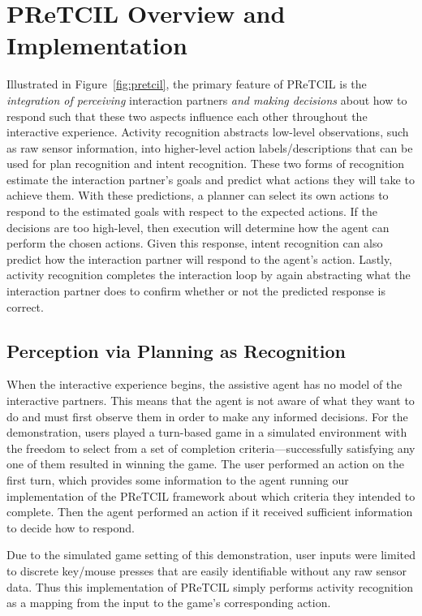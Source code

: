\documentclass[letterpaper]{article} %
\begin{document}
\section{{\sc PReTCIL} Overview and Implementation\label{sec:pretcil}}
Illustrated in Figure~\ref{fig:pretcil}, the primary feature of {\sc PReTCIL} is the \textit{integration of perceiving} interaction partners \textit{and making decisions} about how to respond such that these two aspects influence each other throughout the interactive experience.  Activity recognition abstracts low-level observations, such as raw sensor information, into higher-level action labels/descriptions that can be used for plan recognition and intent recognition.  These two forms of recognition estimate the interaction partner's goals and predict what actions they will take to achieve them.  With these predictions, a planner can select its own actions to respond to the estimated goals with respect to the expected actions.  If the decisions are too high-level, then execution will determine how the agent can perform the chosen actions.  Given this response, intent recognition can also predict how the interaction partner will respond to the agent's action.  Lastly, activity recognition completes the interaction loop by again abstracting what the interaction partner does to confirm whether or not the predicted response is correct.

\subsection{Perception via Planning as Recognition\label{sec:pretcil.perception}}
When the interactive experience begins, the assistive agent has no model of the interactive partners.  This means that the agent is not aware of what they want to do and must first observe them in order to make any informed decisions.  For the demonstration, users played a turn-based game in a simulated environment with the freedom to select from a set of completion criteria---successfully satisfying any one of them resulted in winning the game.  The user performed an action on the first turn, which provides some information to the agent running our implementation of the {\sc PReTCIL} framework about which criteria they intended to complete.  Then the agent performed an action if it received sufficient information to decide how to respond. %

Due to the simulated game setting of this demonstration, user inputs were limited to discrete key/mouse %
presses that are easily identifiable without any raw sensor data.  Thus this implementation of {\sc PReTCIL}
simply performs activity recognition as a mapping from the input to the game's corresponding action.
\end{document}
